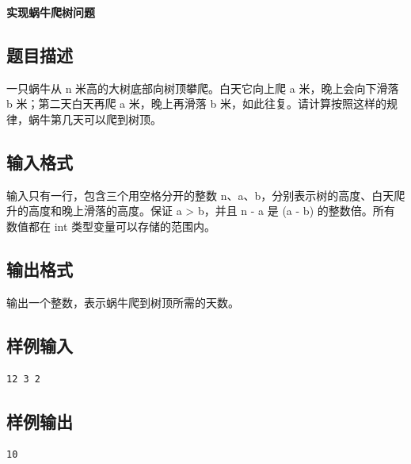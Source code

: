 \documentclass{article}
\newcommand{\problemname}[1]{\begin{center}\Large\bfseries #1\end{center}}
\begin{document}
\problemname{实现蜗牛爬树问题}

\subsection*{题目描述}
一只蜗牛从 n 米高的大树底部向树顶攀爬。白天它向上爬 a 米，晚上会向下滑落 b 米；第二天白天再爬 a 米，晚上再滑落 b 米，如此往复。请计算按照这样的规律，蜗牛第几天可以爬到树顶。

\subsection*{输入格式}
输入只有一行，包含三个用空格分开的整数 n、a、b，分别表示树的高度、白天爬升的高度和晚上滑落的高度。保证 a > b，并且 n - a 是 (a - b) 的整数倍。所有数值都在 int 类型变量可以存储的范围内。

\subsection*{输出格式}
输出一个整数，表示蜗牛爬到树顶所需的天数。

\subsection*{样例输入}
\begin{verbatim}
12 3 2
\end{verbatim}

\subsection*{样例输出}
\begin{verbatim}
10
\end{verbatim}
\end{document}
